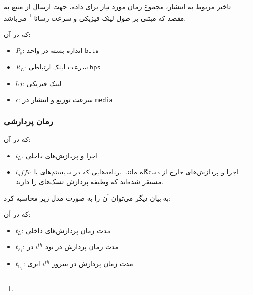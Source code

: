 تاخیر مربوط به انتشار، مجموع زمان مورد نیاز برای داده، جهت ارسال از منبع به مقصد
که مبتنی بر طول لینک فیزیکی و سرعت رسانا \footnote{} می‌باشد.


که در آن:

\begin{itemize}
    \item $P_s$: اندازه بسته در واحد \texttt{bits}
    \item $R_L$: سرعت لینک ارتباطی \texttt{bps}
\end{itemize}


\begin{itemize}
    \item $l_ij$: لینک فیزیکی
    \item $c$: سرعت توزیع و انتشار در \texttt{media}
\end{itemize}

\subsubsection{زمان پردازشی}


که در آن:

\begin{itemize}
    \item $t_L$: اجرا و پردازش‌های داخلی
    \item $t_offi$: اجرا و پردازش‌های خارج از دستگاه  مانند برنامه‌هایی
    که در سیستم‌های  یا  مستقر شده‌اند که وظیفه پردازش تسک‌های
     را دارند.
\end{itemize}

به بیان دیگر می‌توان آن را به صورت مدل زیر محاسبه کرد:


که در آن:

\begin{itemize}
    \item $t_L$: مدت زمان پردازش‌های داخلی
    \item $t_{F_i}$: مدت زمان پردازش در نود $i^{th}$ در 
    \item $t_{C_i}$: مدت زمان پردازش در سرور $i^{th}$ ابری
\end{itemize}

